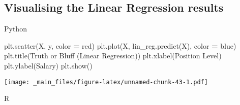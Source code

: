 \documentclass[
]{book}
\newenvironment{Shaded}{\begin{snugshade}}{\end{snugshade}}
\newcommand{\AttributeTok}[1]{\textcolor[rgb]{0.77,0.63,0.00}{#1}}
\newcommand{\CommentTok}[1]{\textcolor[rgb]{0.56,0.35,0.01}{\textit{#1}}}
\newcommand{\FunctionTok}[1]{\textcolor[rgb]{0.00,0.00,0.00}{#1}}
\newcommand{\NormalTok}[1]{#1}
\newcommand{\OperatorTok}[1]{\textcolor[rgb]{0.81,0.36,0.00}{\textbf{#1}}}
\newcommand{\SpecialCharTok}[1]{\textcolor[rgb]{0.00,0.00,0.00}{#1}}
\newcommand{\StringTok}[1]{\textcolor[rgb]{0.31,0.60,0.02}{#1}}
\theoremstyle{definition}
\theoremstyle{definition}
\theoremstyle{definition}
\theoremstyle{definition}
\theoremstyle{remark}
\begin{document}
\hypertarget{visualising-the-linear-regression-results}{%
\subsection{Visualising the Linear Regression results}\label{visualising-the-linear-regression-results}}

Python

\begin{Shaded}
\begin{Highlighting}[]
\NormalTok{plt.scatter(X, y, color }\OperatorTok{=} \StringTok{\textquotesingle{}red\textquotesingle{}}\NormalTok{)}
\NormalTok{plt.plot(X, lin\_reg.predict(X), color }\OperatorTok{=} \StringTok{\textquotesingle{}blue\textquotesingle{}}\NormalTok{)}
\NormalTok{plt.title(}\StringTok{\textquotesingle{}Truth or Bluff (Linear Regression)\textquotesingle{}}\NormalTok{)}
\NormalTok{plt.xlabel(}\StringTok{\textquotesingle{}Position Level\textquotesingle{}}\NormalTok{)}
\NormalTok{plt.ylabel(}\StringTok{\textquotesingle{}Salary\textquotesingle{}}\NormalTok{)}
\NormalTok{plt.show()}
\end{Highlighting}
\end{Shaded}

\texttt{[image: \_main\_files/figure-latex/unnamed-chunk-43-1.pdf]}

R

\begin{Shaded}
\end{Shaded}
\end{document}
